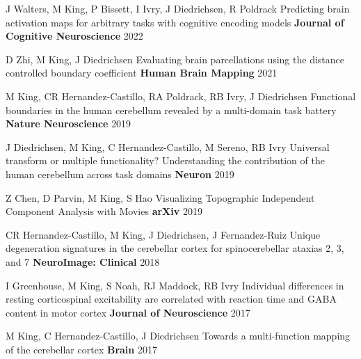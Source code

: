 \begin{cventries}
  \cventry
    {J Walters, M King, P Bissett, I Ivry, J Diedrichsen, R Poldrack} %
    {Predicting brain activation maps for arbitrary tasks with cognitive encoding models} %
    {\textbf{Journal of Cognitive Neuroscience}} %
    {2022} %
    {}
   
  \cventry
    {D Zhi, M King, J Diedrichsen} %
    {Evaluating brain parcellations using the distance controlled boundary coefficient} %
    {\textbf{Human Brain Mapping}} %
    {2021} %
    {}
    
  \cventry
    {M King, CR Hernandez-Castillo, RA Poldrack, RB Ivry, J Diedrichsen} %
    {Functional boundaries in the human cerebellum revealed by a multi-domain task battery} %
    {\textbf{Nature Neuroscience}} %
    {2019} %
    {}
    
  \cventry
    {J Diedrichsen, M King, C Hernandez-Castillo, M Sereno, RB Ivry} %
    {Universal transform or multiple functionality? Understanding the contribution of the human cerebellum across task domains} %
    {\textbf{Neuron}} %
    {2019} %
    {}
    
  \cventry
    {Z Chen, D Parvin, M King, S Hao} %
    {Visualizing Topographic Independent Component Analysis with Movies} %
    {\textbf{arXiv}} %
    {2019} %
    {}
    
  \cventry
    {CR Hernandez-Castillo, M King, J Diedrichsen, J Fernandez-Ruiz} %
    {Unique degeneration signatures in the cerebellar cortex for spinocerebellar ataxias 2, 3, and 7} %
    {\textbf{NeuroImage: Clinical}} %
    {2018} %
    {}
    
  \cventry
    {I Greenhouse, M King, S Noah, RJ Maddock, RB Ivry} %
    {Individual differences in resting corticospinal excitability are correlated with reaction time and GABA content in motor cortex} %
    {\textbf{Journal of Neuroscience}} %
    {2017} %
    {}
    
  \cventry
    {M King, C Hernandez-Castillo, J Diedrichsen} %
    {Towards a multi-function mapping of the cerebellar cortex} %
    {\textbf{Brain}} %
    {2017} %
    {}
    

\end{cventries}
